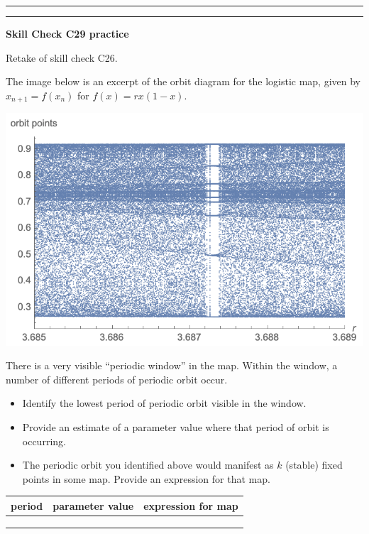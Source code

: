 \documentclass[12pt,letterpaper,noanswers]{exam}
\begin{document}
\vspace{0.2cm}
\hrule
\vspace{0.2cm}

\vspace{0.2cm}
\hrule
\vspace{0.2cm}

\noindent\textbf{Skill Check C29 practice}
\begin{questions}
\item Retake of skill check C26.

\item The image below is an excerpt of the orbit diagram for the logistic map, given by $x_{n+1} = f(x_n)$ for $f(x) = rx(1-x).$

\includegraphics{img/C28-2019-11-11p2.png}

There is a very visible ``periodic window'' in the map.  Within the window, a number of different periods of periodic orbit occur.

\begin{itemize}
    \item Identify the lowest period of periodic orbit visible in the window.
    \item Provide an estimate of a parameter value where that period of orbit is occurring.
    \item The periodic orbit you identified above would manifest as $k$ (stable) fixed points in some map.  Provide an expression for that map.
\end{itemize}  

\begin{tabular}{|c|c|c|}
\hline
period & parameter value & expression for map \\
\hline
& &\\
& &\\
& &\\
\hline
\end{tabular}
\end{questions}
\end{document}
